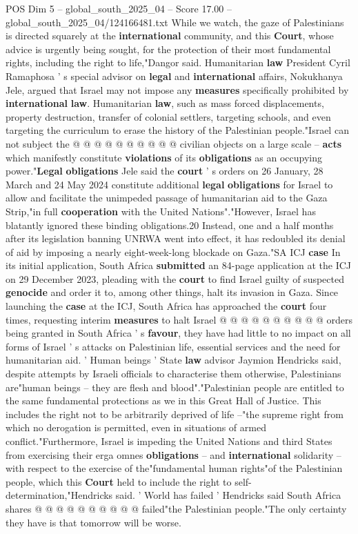 \begin{textsample}{POS Dim 5 – global\_south\_2025\_04 – Score 17.00 – global\_south\_2025\_04/124166481.txt}
While we watch, the gaze of Palestinians is directed squarely at the \textbf{international} community, and this \textbf{Court}, whose advice is urgently being sought, for the protection of their most fundamental rights, including the right to life,"Dangor said.
Humanitarian \textbf{law} President Cyril Ramaphosa ' s special advisor on \textbf{legal} and \textbf{international} affairs, Nokukhanya Jele, argued that Israel may not impose any \textbf{measures} specifically prohibited by \textbf{international} \textbf{law}.
Humanitarian \textbf{law}, such as mass forced displacements, property destruction, transfer of colonial settlers, targeting schools, and even targeting the curriculum to erase the history of the Palestinian people."Israel can not subject the @ @ @ @ @ @ @ @ @ @ civilian objects on a large scale -- \textbf{acts} which manifestly constitute \textbf{violations} of its \textbf{obligations} as an occupying power."\textbf{Legal} \textbf{obligations} Jele said the \textbf{court} ' s orders on 26 January, 28 March and 24 May 2024 constitute additional \textbf{legal} \textbf{obligations} for Israel to allow and facilitate the unimpeded passage of humanitarian aid to the Gaza Strip,"in full \textbf{cooperation} with the United Nations"."However, Israel has blatantly ignored these binding obligations.20 Instead, one and a half months after its legislation banning UNRWA went into effect, it has redoubled its denial of aid by imposing a nearly eight-week-long blockade on Gaza."SA ICJ \textbf{case} In its initial application, South Africa \textbf{submitted} an 84-page application at the ICJ on 29 December 2023, pleading with the \textbf{court} to find Israel guilty of suspected \textbf{genocide} and order it to, among other things, halt its invasion in Gaza.
Since launching the \textbf{case} at the ICJ, South Africa has approached the \textbf{court} four times, requesting interim \textbf{measures} to halt Israel @ @ @ @ @ @ @ @ @ @ orders being granted in South Africa ' s \textbf{favour}, they have had little to no impact on all forms of Israel ' s attacks on Palestinian life, essential services and the need for humanitarian aid. ' Human beings ' State \textbf{law} advisor Jaymion Hendricks said, despite attempts by Israeli officials to characterise them otherwise, Palestinians are"human beings -- they are flesh and blood"."Palestinian people are entitled to the same fundamental protections as we in this Great Hall of Justice.
This includes the right not to be arbitrarily deprived of life --"the supreme right from which no derogation is permitted, even in situations of armed conflict."Furthermore, Israel is impeding the United Nations and third States from exercising their erga omnes \textbf{obligations} -- and \textbf{international} solidarity -- with respect to the exercise of the"fundamental human rights"of the Palestinian people, which this \textbf{Court} held to include the right to self-determination,"Hendricks said. ' World has failed ' Hendricks said South Africa shares @ @ @ @ @ @ @ @ @ @ failed"the Palestinian people."The only certainty they have is that tomorrow will be worse.

\end{textsample}
